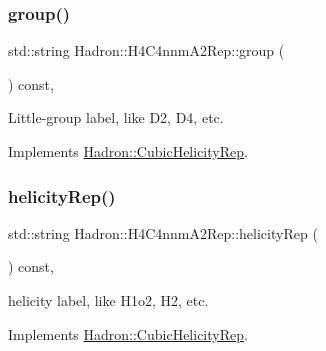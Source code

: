 \mbox{\label{structHadron_1_1H4C4nnmA2Rep_ae437f39da33de8e2ad9b152325fa7ce2}} 
\subsubsection{\texorpdfstring{group()}{group()}\hspace{0.1cm}{\footnotesize\ttfamily [5/5]}}
{\footnotesize\ttfamily std\+::string Hadron\+::\+H4\+C4nnm\+A2\+Rep\+::group (\begin{DoxyParamCaption}{ }\end{DoxyParamCaption}) const\hspace{0.3cm}{\ttfamily [inline]}, {\ttfamily [virtual]}}

Little-\/group label, like D2, D4, etc. 

Implements \mbox{\hyperlink{structHadron_1_1CubicHelicityRep_a101a7d76cd8ccdad0f272db44b766113}{Hadron\+::\+Cubic\+Helicity\+Rep}}.

\mbox{\label{structHadron_1_1H4C4nnmA2Rep_a22ac4fc575c83f59d3df9d247a6523a8}} 
\subsubsection{\texorpdfstring{helicityRep()}{helicityRep()}\hspace{0.1cm}{\footnotesize\ttfamily [1/3]}}
{\footnotesize\ttfamily std\+::string Hadron\+::\+H4\+C4nnm\+A2\+Rep\+::helicity\+Rep (\begin{DoxyParamCaption}{ }\end{DoxyParamCaption}) const\hspace{0.3cm}{\ttfamily [inline]}, {\ttfamily [virtual]}}

helicity label, like H1o2, H2, etc. 

Implements \mbox{\hyperlink{structHadron_1_1CubicHelicityRep_af1096946b7470edf0a55451cc662f231}{Hadron\+::\+Cubic\+Helicity\+Rep}}.

\mbox{\label{structHadron_1_1H4C4nnmA2Rep_a22ac4fc575c83f59d3df9d247a6523a8}} 
